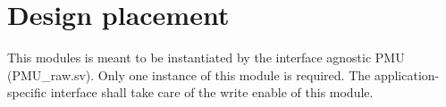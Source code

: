 \section{Design placement}
\label{chapter2}
This modules is meant to be instantiated by the interface agnostic PMU (PMU\_raw.sv). Only one instance of this module is required. The application-specific interface shall take care of the  write enable of this module.




